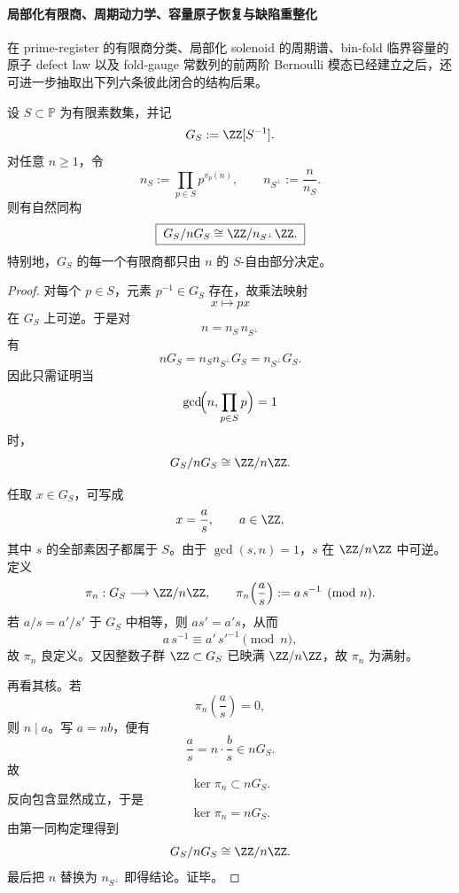 \paragraph{局部化有限商、周期动力学、容量原子恢复与缺陷重整化}
在 prime-register 的有限商分类、局部化 solenoid 的周期谱、bin-fold 临界容量的原子 defect law 以及 fold-gauge 常数列的前两阶 Bernoulli 模态已经建立之后，还可进一步抽取出下列六条彼此闭合的结构后果。

\begin{theorem}[局部化数系有限商的精确外部化公式]\label{thm:xi-localized-quotient-exact-sfree-externalization}
设 \(S\subset\mathbb P\) 为有限素数集，并记
\[
G_S:=\ZZ[S^{-1}].
\]
对任意 \(n\ge 1\)，令
\[
n_S:=\prod_{p\in S}p^{v_p(n)},
\qquad
n_{S^\perp}:=\frac{n}{n_S}.
\]
则有自然同构
\[
\boxed{\;
G_S/nG_S\cong \ZZ/n_{S^\perp}\ZZ.\;}
\]
特别地，\(G_S\) 的每一个有限商都只由 \(n\) 的 \(S\)-自由部分决定。
\end{theorem}
\begin{proof}
对每个 \(p\in S\)，元素 \(p^{-1}\in G_S\) 存在，故乘法映射
\[
x\longmapsto px
\]
在 \(G_S\) 上可逆。于是对
\[
n=n_S\,n_{S^\perp}
\]
有
\[
nG_S=n_Sn_{S^\perp}G_S=n_{S^\perp}G_S.
\]
因此只需证明当
\[
\gcd\!\Bigl(n,\prod_{p\in S}p\Bigr)=1
\]
时，
\[
G_S/nG_S\cong \ZZ/n\ZZ.
\]

任取 \(x\in G_S\)，可写成
\[
x=\frac{a}{s},
\qquad
a\in\ZZ,
\]
其中 \(s\) 的全部素因子都属于 \(S\)。由于 \(\gcd(s,n)=1\)，\(s\) 在 \(\ZZ/n\ZZ\) 中可逆。定义
\[
\pi_n:G_S\longrightarrow \ZZ/n\ZZ,
\qquad
\pi_n\!\left(\frac{a}{s}\right):=a\,s^{-1}\pmod n.
\]
若 \(a/s=a'/s'\) 于 \(G_S\) 中相等，则 \(as'=a's\)，从而
\[
a\,s^{-1}\equiv a'\,s'^{-1}\pmod n,
\]
故 \(\pi_n\) 良定义。又因整数子群 \(\ZZ\subset G_S\) 已映满 \(\ZZ/n\ZZ\)，故 \(\pi_n\) 为满射。

再看其核。若
\[
\pi_n\!\left(\frac{a}{s}\right)=0,
\]
则 \(n\mid a\)。写 \(a=nb\)，便有
\[
\frac{a}{s}=n\cdot \frac{b}{s}\in nG_S.
\]
故
\[
\ker\pi_n\subset nG_S.
\]
反向包含显然成立，于是
\[
\ker\pi_n=nG_S.
\]
由第一同构定理得到
\[
G_S/nG_S\cong \ZZ/n\ZZ.
\]
最后把 \(n\) 替换为 \(n_{S^\perp}\) 即得结论。证毕。
\end{proof}

